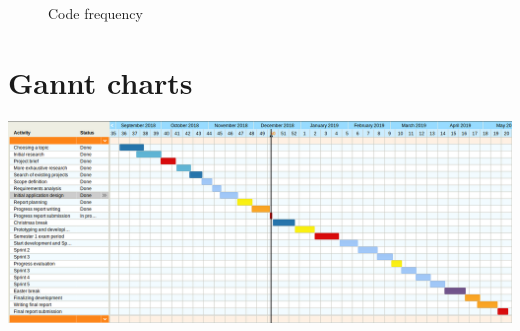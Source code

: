 \documentclass{article}
\begin{document}
\begin{figure}[!htb]
	\caption{Code frequency}
\end{figure}


\section{Gannt charts}\label{sec:appendix-gantt}
\begin{center}
	\begin{sideways}%
		\begin{minipage}{0.92\textheight}
			\includegraphics[width=\linewidth,keepaspectratio]
			{Gannt.png}
			\label{fig:xx}
		\end{minipage}
	\end{sideways}
\end{center}
\end{document}
